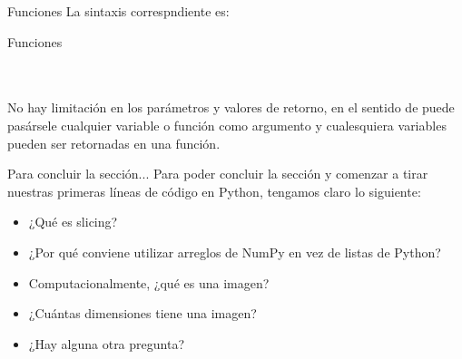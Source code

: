 \documentclass[usenames,dvipsnames]{beamer}
\begin{document}
  \begin{frame}{Funciones}
    La sintaxis correspndiente es:
    \begin{block}{Funciones}
      \\
      \\
      \\
      \vspace*{0.5cm}
    \end{block}
    \vspace*{0.5cm}

    No hay limitación en los parámetros y valores de retorno, en el sentido de
    puede pasársele cualquier variable o función como argumento y cualesquiera
    variables pueden ser retornadas en una función.
  \end{frame}

  \begin{frame}{Para concluir la sección...}
    Para poder concluir la sección y comenzar a tirar nuestras primeras
    líneas de código en Python, tengamos claro lo siguiente:
    \begin{itemize}
      \item ¿Qué es slicing?
      \item ¿Por qué conviene utilizar arreglos de NumPy en vez de listas
      de Python?
      \item Computacionalmente, ¿qué es una imagen?
      \item ¿Cuántas dimensiones tiene una imagen?
      \item ¿Hay alguna otra pregunta?
    \end{itemize}
  \end{frame}

\end{document}
